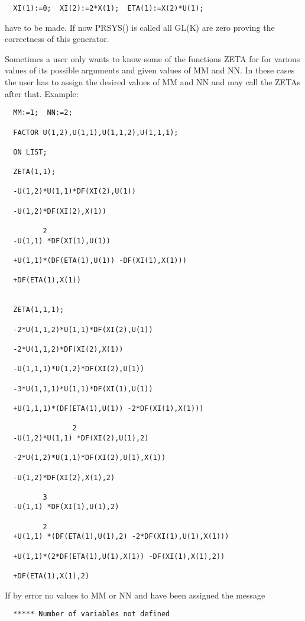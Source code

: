 \begin{verbatim}
  XI(1):=0;  XI(2):=2*X(1);  ETA(1):=X(2)*U(1);
\end{verbatim}

have to be made. If now PRSYS() is called all GL(K) are zero
proving the correctness of this generator.

Sometimes a user only wants to know some of the functions ZETA for for
various values of its possible arguments and given values of MM and
NN. In these cases the user has to assign the desired values of MM and
NN and may call the ZETAs after that. Example:

\begin{verbatim}
  MM:=1;  NN:=2;

  FACTOR U(1,2),U(1,1),U(1,1,2),U(1,1,1);

  ON LIST;

  ZETA(1,1);

  -U(1,2)*U(1,1)*DF(XI(2),U(1))

  -U(1,2)*DF(XI(2),X(1))

         2
  -U(1,1) *DF(XI(1),U(1))

  +U(1,1)*(DF(ETA(1),U(1)) -DF(XI(1),X(1)))

  +DF(ETA(1),X(1))


  ZETA(1,1,1);

  -2*U(1,1,2)*U(1,1)*DF(XI(2),U(1))

  -2*U(1,1,2)*DF(XI(2),X(1))

  -U(1,1,1)*U(1,2)*DF(XI(2),U(1))

  -3*U(1,1,1)*U(1,1)*DF(XI(1),U(1))

  +U(1,1,1)*(DF(ETA(1),U(1)) -2*DF(XI(1),X(1)))

                2
  -U(1,2)*U(1,1) *DF(XI(2),U(1),2)

  -2*U(1,2)*U(1,1)*DF(XI(2),U(1),X(1))

  -U(1,2)*DF(XI(2),X(1),2)

         3
  -U(1,1) *DF(XI(1),U(1),2)

         2
  +U(1,1) *(DF(ETA(1),U(1),2) -2*DF(XI(1),U(1),X(1)))

  +U(1,1)*(2*DF(ETA(1),U(1),X(1)) -DF(XI(1),X(1),2))

  +DF(ETA(1),X(1),2)
\end{verbatim}

If by error no values to MM or NN and have been assigned the message

\begin{verbatim}
  ***** Number of variables not defined
\end{verbatim}

